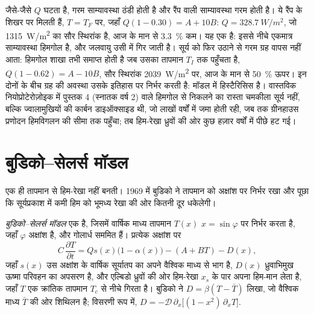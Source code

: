 
जैसे-जैसे $Q$ घटता है, गरम साम्यावस्था ठंडी होती है और रैंप वाली साम्यावस्था गरम होती है।
ये रैंप के शिखर पर मिलती हैं, $T = T_F$ पर, जहाँ $Q(1 - 0.30) = A +
10B$: $Q = \qty{328.7}{W/m^2}$, जो \qty{1315}{W/m^2} का सौर स्थिरांक है,
आज के मान से \qty{3.3}{\percent} कम। यह एक  है: इससे नीचे
एकमात्र साम्यावस्था हिमगोल है, और जलवायु उसी में गिर जाती है।
सूर्य को फिर उठाने से गरम ग्रह वापस नहीं आता: हिमगोल
शाखा तभी समाप्त होती है जब उसका तापमान $T_I$ तक पहुँचता है, $Q(1 - 0.62) = A -
10B$, सौर स्थिरांक \qty{2039}{W/m^2} पर, आज के
मान से \qty{50}{\percent} ऊपर। इन दोनों के बीच ग्रह की अवस्था उसके इतिहास पर निर्भर करती है:
मॉडल में हिस्टैरिसिस है। वास्तविक नियोप्रोटेरोज़ोइक में
पुस्तक 4 (स्नातक वर्ष 2) वाले हिमगोल से निकलने का रास्ता चमकीला सूर्य नहीं, बल्कि ज्वालामुखियों की
कार्बन डाइऑक्साइड थी, जो लाखों वर्षों में जमा होती रही, जब तक ग्रीनहाउस
प्रणोदन हिमविगलन की सीमा तक पहुँचा; तब हिम-रेखा ध्रुवों की ओर
कुछ हज़ार वर्षों में पीछे हट गई।

\section{बुडिको--सेलर्स मॉडल}\label{sec:b3:climate-models:budyko-sellers}

एक ही तापमान से हिम-रेखा नहीं बनती। 1969 में बुडिको ने तापमान को
अक्षांश पर निर्भर रखा और पूछा कि सूर्यप्रकाश में कमी
हिम को भूमध्य रेखा की ओर कितनी दूर धकेलेगी।

\begin{definition}[बुडिको--सेलर्स मॉडल]\label{def:b3:climate-models:budyko-sellers}
\emph{बुडिको--सेलर्स मॉडल} एक
 है, जिसमें वार्षिक माध्य तापमान $T(x)$
$x = \sin\varphi$ पर निर्भर करता है, जहाँ $\varphi$ अक्षांश है, और गोलार्ध सममित हैं।
प्रत्येक अक्षांश पर
\[
C\,\frac{\partial T}{\partial t} = Qs(x)\big(1 - \alpha(x)\big) - (A + BT) - D(x) ,
\]
जहाँ $s(x)$ उस अक्षांश के वार्षिक सूर्यातप का अपने वैश्विक
माध्य से भाग है, $D(x)$ ध्रुवाभिमुख ऊष्मा परिवहन का अपसरण है, और एल्बिडो
ध्रुवों की ओर हिम-रेखा $x_s$ के पार अपना हिम-मान लेता है, जहाँ $T$ एक
क्रांतिक तापमान $T_c$ से नीचे गिरता है। बुडिको ने $D = \beta(T - \bar T)$ लिखा, जो
वैश्विक माध्य $\bar T$ की ओर शिथिलन है; विसरणी रूप में, $D =
-\mathcal D\,\partial_x\big[(1 - x^2)\,\partial_xT\big]$.
\end{definition}

